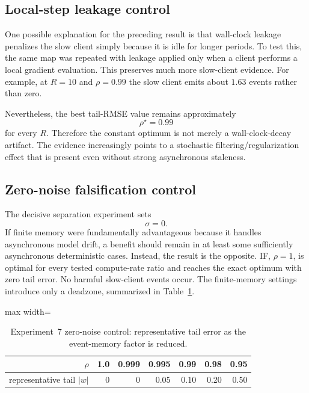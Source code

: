\subsection{Local-step leakage control}

One possible explanation for the preceding result is that wall-clock leakage penalizes the slow client simply because it is idle for longer periods. To test this, the same map was repeated with leakage applied only when a client performs a local gradient evaluation. This preserves much more slow-client evidence. For example, at $R=10$ and $\rho=0.99$ the slow client emits about $1.63$ events rather than zero.

Nevertheless, the best tail-RMSE value remains approximately
\begin{equation}
  \rho^\star=0.99
\end{equation}
for every $R$. Therefore the constant optimum is not merely a wall-clock-decay artifact. The evidence increasingly points to a stochastic filtering/regularization effect that is present even without strong asynchronous staleness.

\subsection{Zero-noise falsification control}

The decisive separation experiment sets
\begin{equation}
  \sigma=0.
\end{equation}
If finite memory were fundamentally advantageous because it handles asynchronous model drift, a benefit should remain in at least some sufficiently asynchronous deterministic cases. Instead, the result is the opposite. IF, $\rho=1$, is optimal for every tested compute-rate ratio and reaches the exact optimum with zero tail error. No harmful slow-client events occur. The finite-memory settings introduce only a deadzone, summarized in Table~\ref{tab:exp7-zero-noise}.

\begin{table}[ht]
\centering
\small
\caption{Experiment~7 zero-noise control: representative tail error as the event-memory factor is reduced.}
\label{tab:exp7-zero-noise}
\begin{adjustbox}{max width=\textwidth}
\begin{tabular}{rrrrrrr}
\toprule
$\rho$ & 1.0 & 0.999 & 0.995 & 0.99 & 0.98 & 0.95 \\
\midrule
representative tail $|w|$ & 0 & 0 & 0.05 & 0.10 & 0.20 & 0.50 \\
\bottomrule
\end{tabular}
\end{adjustbox}
\end{table}

